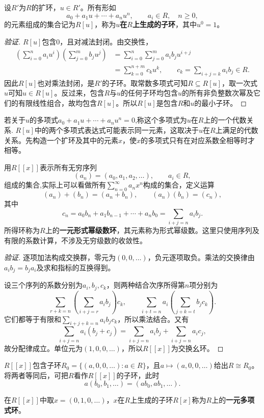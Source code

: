 \begin{definition}
设$R'$为$R$的扩环，$u\in R'$。所有形如
\[
a_0+a_1u+\cdots+a_nu^n,\qquad a_i\in R,\quad n\ge0,
\]
的元素组成的集合记为$R[u]$，称为\textbf{$u$在$R$上生成的子环}，其中$u^0=1$。
\end{definition}
\begin{proof}[验证]
$R[u]$包含$0$，且对减法封闭。由交换性，
\begin{align*}
\left(\sum_{i=0}^n a_i u^i\right)
\left(\sum_{j=0}^m b_j u^j\right)
&=\sum_{i=0}^n\sum_{j=0}^m a_i b_j u^{i+j}\\
&=\sum_{k=0}^{n+m}c_k u^k,
\qquad c_k=\sum_{i+j=k}a_i b_j\in R.
\end{align*}
因此$R[u]$也对乘法封闭，是$R'$的子环。取常数多项式可知$R\subseteq R[u]$，取一次式$u$可知$u\in R[u]$。反过来，包含$R$与$u$的任何子环均包含$u$的所有非负整数次幂及它们的有限线性组合，故均包含$R[u]$。所以$R[u]$是包含$R$和$u$的最小子环。
\end{proof}
若关于$u$的多项式$a_0+a_1 u +\cdots +a_n u^n=0$,称这个多项式为$u$在$R$上的一个代数关系.
$R[u]$中的两个多项式表达式可能表示同一元素，这取决于$u$在$R$上满足的代数关系。先构造一个扩环及其中的元素$x$，使$x$的多项式只有在对应系数全相等时才相等。

\begin{definition}
用$R[[x]]$表示所有无穷序列
\[
(a_n)=(a_0,a_1,a_2,\ldots),\qquad a_i\in R,
\]
组成的集合,实际上可以看做所有$\sum\limits_{n=0}^{\infty}a_n x^n$构成的集合，定义运算
\[
(a_n)+(b_n)=(a_n+b_n),\qquad (a_n)(b_n)=(c_n),
\]
其中
\[
c_n=a_0b_n+a_1b_{n-1}+\cdots+a_nb_0
=\sum_{i+j=n}a_i b_j.
\]
所得环称为$R$上的\textbf{一元形式幂级数环}，其元素称为形式幂级数。这里只使用序列及有限的系数计算，不涉及无穷级数的收敛性。
\end{definition}
\begin{proof}[验证]
逐项加法构成交换群，零元为$(0,0,\ldots)$，负元逐项取负。乘法的交换律由$a_i b_j=b_j a_i$及求和指标的互换得到。

设三个序列的系数分别为$a_i,b_j,c_k$，则两种结合次序所得第$n$项分别为
\[
\sum_{r+k=n}\left(\sum_{i+j=r}a_i b_j\right)c_k,
\qquad
\sum_{i+t=n}a_i\left(\sum_{j+k=t}b_j c_k\right).
\]
它们都等于有限和$\sum_{i+j+k=n}a_i b_j c_k$，所以乘法结合。又有
\[
\sum_{i+j=n}a_i(b_j+c_j)
=\sum_{i+j=n}a_i b_j+\sum_{i+j=n}a_i c_j,
\]
故分配律成立。单位元为$(1,0,0,\ldots)$，所以$R[[x]]$为交换幺环。


\end{proof}
$R[[x]]$包含子环$R_0=\{(a,0,0,\ldots):a\in R\}$，且$a\mapsto(a,0,0,\ldots)$给出$R\cong R_0$。将两者等同后，可把$R$看作$R[[x]]$的子环，此时
\[
a(b_0,b_1,\ldots)=(ab_0,ab_1,\ldots).
\]
\begin{definition}
在$R[[x]]$中取$x=(0,1,0,\ldots)$，$x$在$R$上生成的子环$R[x]$称为$R$上的\textbf{一元多项式环}。
\end{definition}

